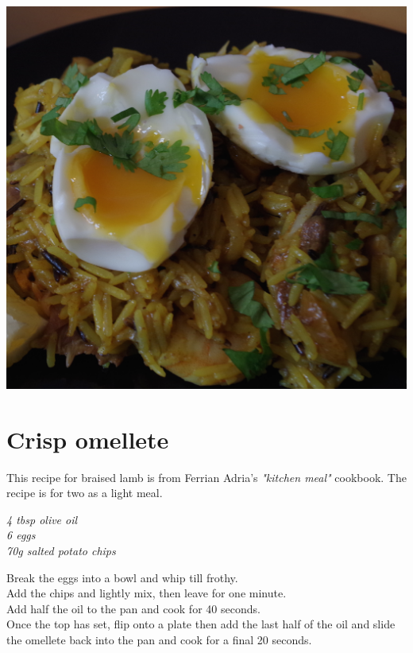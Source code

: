\documentclass{tufte-book}
\begin{document}
\begin{marginfigure}%
  \includegraphics[width=\linewidth]{kedgeree.png}
\end{marginfigure}


\section{Crisp omellete}

This recipe for braised lamb is from Ferrian Adria's \emph{"kitchen meal"} cookbook. The recipe is for two as a light meal. 

\smallskip
\emph{4 tbsp olive oil
\\6 eggs
\\70g salted potato chips
}

\smallskip
Break the eggs into a bowl and whip till frothy.
\\Add the chips and lightly mix, then leave for one minute.
\\Add half the oil to the pan and cook for 40 seconds.
\\Once the top has set, flip onto a plate then add the last half of the oil and slide the omellete back into the pan and cook for a final 20 seconds.

\newpage
\end{document}
